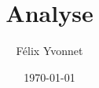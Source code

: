 \documentclass[a4paper,twoside]{article}
\title{Analyse}
\author{Félix Yvonnet}
\date{\today}
\begin{document}
\renewcommand{\labelitemi}{\textbullet}
\renewcommand{\labelitemii}{$\circ$}


\maketitle



\end{document}
